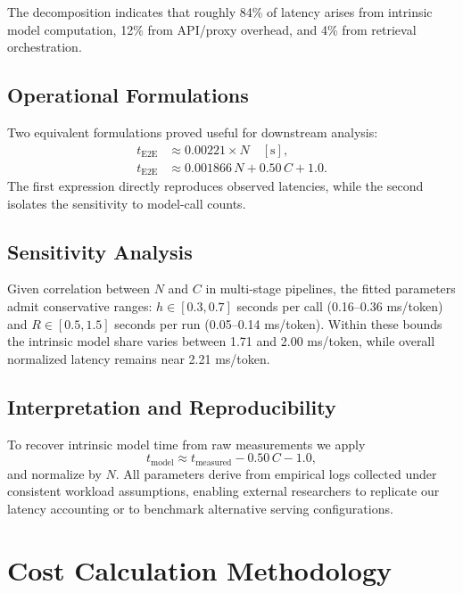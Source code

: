 \documentclass[11pt]{article}
\begin{document}
The decomposition indicates that roughly 84\% of latency arises from intrinsic model computation, 12\% from API/proxy overhead, and 4\% from retrieval orchestration.

\subsection{Operational Formulations}

Two equivalent formulations proved useful for downstream analysis:
\begin{align}
  t_{\mathrm{E2E}} &\approx 0.00221 \times N \quad [\mathrm{s}], \\
  t_{\mathrm{E2E}} &\approx 0.001866\,N + 0.50\,C + 1.0.
\end{align}
The first expression directly reproduces observed latencies, while the second isolates the sensitivity to model-call counts.

\subsection{Sensitivity Analysis}

Given correlation between $N$ and $C$ in multi-stage pipelines, the fitted parameters admit conservative ranges: $h \in [0.3,0.7]$ seconds per call (0.16--0.36 ms/token) and $R \in [0.5,1.5]$ seconds per run (0.05--0.14 ms/token). Within these bounds the intrinsic model share varies between 1.71 and 2.00 ms/token, while overall normalized latency remains near 2.21 ms/token.

\subsection{Interpretation and Reproducibility}

To recover intrinsic model time from raw measurements we apply
\begin{equation}
  t_{\mathrm{model}} \approx t_{\mathrm{measured}} - 0.50\,C - 1.0,
\end{equation}
and normalize by $N$. All parameters derive from empirical logs collected under consistent workload assumptions, enabling external researchers to replicate our latency accounting or to benchmark alternative serving configurations.

\section{Cost Calculation Methodology}
\label{sec:appendix-cost}
\end{document}
